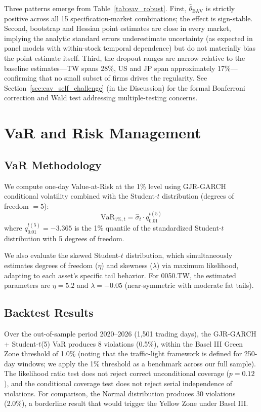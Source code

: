 Three patterns emerge from Table~\ref{tab:eav_robust}. First, $\hat{\theta}_{\text{EAV}}$ is strictly positive across all 15 specification-market combinations; the effect is sign-stable. Second, bootstrap and Hessian point estimates are close in every market, implying the analytic standard errors underestimate uncertainty (as expected in panel models with within-stock temporal dependence) but do not materially bias the point estimate itself. Third, the dropout ranges are narrow relative to the baseline estimates---TW spans 28\%, US and JP span approximately 17\%---confirming that no small subset of firms drives the regularity. See Section~\ref{sec:eav_self_challenge} (in the Discussion) for the formal Bonferroni correction and Wald test addressing multiple-testing concerns.


\section{VaR and Risk Management}
\label{sec:var}

\subsection{VaR Methodology}

We compute one-day Value-at-Risk at the 1\% level using GJR-GARCH conditional volatility combined with the Student-$t$ distribution (degrees of freedom $= 5$):
\begin{equation}
\text{VaR}_{1\%,t} = \hat{\sigma}_t \cdot q_{0.01}^{t(5)}
\label{eq:var}
\end{equation}
where $q_{0.01}^{t(5)} = -3.365$ is the 1\% quantile of the standardized Student-$t$ distribution with 5 degrees of freedom.

We also evaluate the skewed Student-$t$ distribution, which simultaneously estimates degrees of freedom ($\eta$) and skewness ($\lambda$) via maximum likelihood, adapting to each asset's specific tail behavior. For 0050.TW, the estimated parameters are $\eta = 5.2$ and $\lambda = -0.05$ (near-symmetric with moderate fat tails).

\subsection{Backtest Results}

Over the out-of-sample period 2020--2026 (1,501 trading days), the GJR-GARCH + Student-$t$(5) VaR produces 8 violations (0.5\%), within the Basel III Green Zone threshold of 1.0\% (noting that the traffic-light framework is defined for 250-day windows; we apply the 1\% threshold as a benchmark across our full sample). The \citet{kupiec1995} likelihood ratio test does not reject correct unconditional coverage ($p = 0.12$), and the \citet{christoffersen1998} conditional coverage test does not reject serial independence of violations. For comparison, the Normal distribution produces 30 violations (2.0\%), a borderline result that would trigger the Yellow Zone under Basel III.

